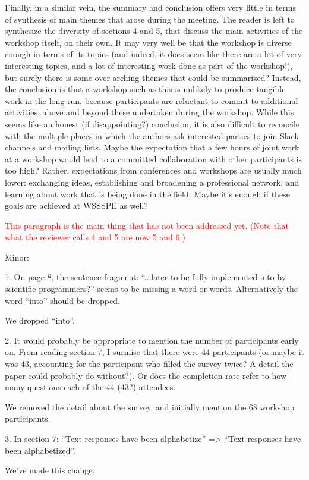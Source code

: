 \documentclass[11pt]{article}
\begin{document}
\begin{quoting}

 
Finally, in a similar vein, the summary and conclusion offers very little in terms of synthesis of main themes that arose during the meeting. The reader is left to synthesize the diversity of sections 4 and 5, that discuss the main activities of the workshop itself, on their own. It may very well be that the workshop is diverse enough in terms of its topics (and indeed, it does seem like there are a lot of very interesting topics, and a lot of interesting work done as part of the workshop!), but surely there is some over-arching themes that could be summarized? Instead, the conclusion is that a workshop such as this is unlikely to produce tangible work in the long run, because participants are reluctant to commit to additional activities, above and beyond these undertaken during the workshop. While this seems like an honest (if disappointing?) conclusion, it is also difficult to reconcile with the multiple places in which the authors ask interested parties to join Slack channels and mailing lists. Maybe the expectation that a few hours of joint work at a workshop would lead to a committed collaboration with other participants is too high? Rather, expectations from conferences and workshops are usually much lower: exchanging ideas, establishing and broadening a professional network, and learning about work that is being done in the field. Maybe it's enough if these goals are achieved at WSSSPE as well?

\end{quoting}
 
\textcolor{red}{This paragraph is the main thing that has not been addressed yet. (Note that what the reviewer calls 4 and 5 are now 5 and 6.)}
 
\begin{quoting}

Minor: 

1. On page 8, the sentence fragment: ``...later to be fully implemented into by scientific programmers?'' seems to be missing a word or words. Alternatively the word ``into'' should be dropped.

\end{quoting}

We dropped ``into''.

\begin{quoting}

2. It would probably be appropriate to mention the number of participants early on. From reading section 7, I surmise that there were 44 participants (or maybe it was 43, accounting for the participant who filled the survey twice? A detail the paper could probably do without?). Or does the completion rate refer to how many questions each of the 44 (43?) attendees. 

\end{quoting}

We removed the detail about the survey, and initially mention the 68 workshop participants.

\begin{quoting}

3. In section 7: ``Text responses have been alphabetize'' => ``Text responses have been alphabetized''.

\end{quoting}

We've made this change.
\end{document}
